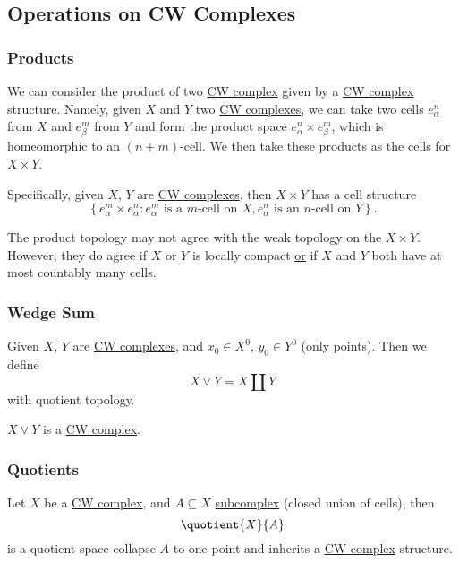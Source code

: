 \subsection{Operations on CW Complexes}
\subsubsection{Products}\label{CW-complex-product}
We can consider the product of two \hyperref[def:CW-Complex]{CW complex} given by a \hyperref[def:CW-Complex]{CW complex} structure. Namely, given \(X\) and \(Y\)
two \hyperref[def:CW-Complex]{CW complexes}, we can take two cells \(e^n_{\alpha }\) from \(X\) and \(e^m_{\beta }\) from \(Y\) and
form the product space \(e^n_{\alpha }\times e^m_{\beta }\), which is homeomorphic to an \((n+m)\)-cell. We then
take these products as the cells for \(X\times Y\).

Specifically, given \(X\), \(Y\) are \hyperref[def:CW-Complex]{CW complexes}, then \(X\times Y\) has a cell structure
\[
	\left\{e_{\alpha}^m \times e_{\alpha}^n\colon e^m_{\alpha}\text{ is a \(m\)-cell on \(X\)}, e^n_{\alpha}\text{ is an \(n\)-cell on \(Y\)}\right\}.
\]
\begin{remark}
	The product topology may not agree with the weak topology on the \(X\times Y\). However, they do agree if
	\(X\) or \(Y\) is locally compact \underline{or} if \(X\) and \(Y\) both have at most countably many cells.
\end{remark}

\subsubsection{Wedge Sum}\label{CW-complex-wedge-sum}
Given \(X\), \(Y\) are \hyperref[def:CW-Complex]{CW complexes}, and \(x_0\in X^0\), \(y_0\in Y^0\) (only points). Then we define
\[
	X\vee Y = X\coprod Y
\]
with quotient topology.
\begin{remark}
	\(X\lor Y\) is a \hyperref[def:CW-Complex]{CW complex}.
\end{remark}

\subsubsection{Quotients}\label{CW-complex-quotient}
Let \(X\) be a \hyperref[def:CW-Complex]{CW complex}, and \(A\subseteq X\) \hyperref[def:CW-subcomplex]{subcomplex} (closed union of cells), then
\[
	\quotient{X}{A}
\]
is a quotient space collapse \(A\) to one point and inherits a \hyperref[def:CW-Complex]{CW complex} structure.

